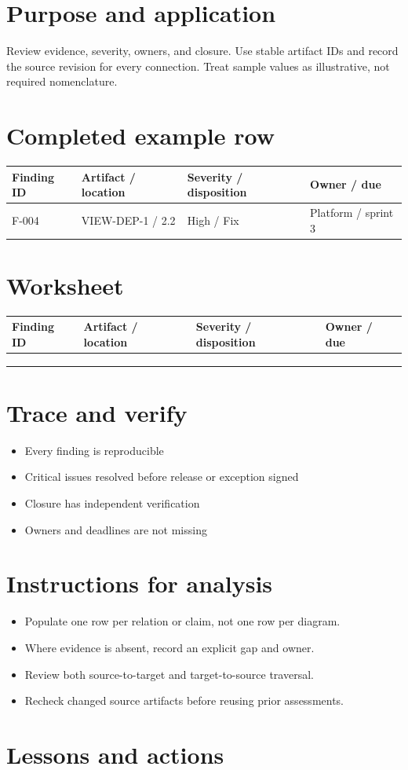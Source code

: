 \documentclass[10pt,letterpaper]{article}
\begin{document}
\DocProvenance
\section{Purpose and application}
Review evidence, severity, owners, and closure. Use stable artifact IDs and record the source revision for every connection. Treat sample values as illustrative, not required nomenclature.

\section{Completed example row}
\small
\begin{tabularx}{\linewidth}{@{}YYYY@{}}
\toprule
\textbf{Finding ID} & \textbf{Artifact / location} & \textbf{Severity / disposition} & \textbf{Owner / due} \\
\midrule
F-004 & VIEW-DEP-1 / 2.2 & High / Fix & Platform / sprint 3 \\
\bottomrule
\end{tabularx}
\normalsize
\section{Worksheet}
\small
\begin{tabularx}{\linewidth}{@{}YYYY@{}}
\toprule
\textbf{Finding ID} & \textbf{Artifact / location} & \textbf{Severity / disposition} & \textbf{Owner / due} \\
\midrule
 &  &  &  \\
 &  &  &  \\
 &  &  &  \\
\bottomrule
\end{tabularx}
\normalsize
\section{Trace and verify}
\begin{itemize}
\item Every finding is reproducible
\item Critical issues resolved before release or exception signed
\item Closure has independent verification
\item Owners and deadlines are not missing
\end{itemize}
\section{Instructions for analysis}
\begin{itemize}
\item Populate one row per relation or claim, not one row per diagram.
\item Where evidence is absent, record an explicit gap and owner.
\item Review both source-to-target and target-to-source traversal.
\item Recheck changed source artifacts before reusing prior assessments.
\end{itemize}
\section{Lessons and actions}
\end{document}
